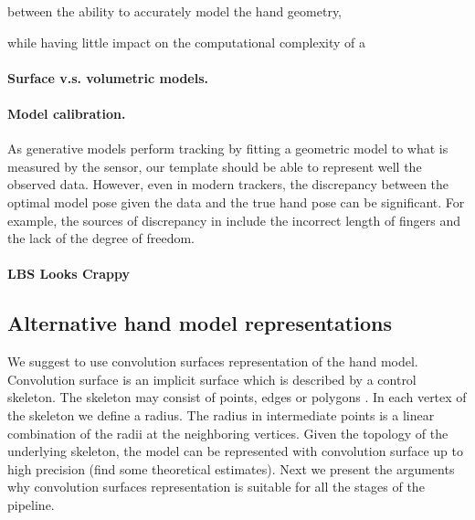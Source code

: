  

 between the ability to accurately model the hand geometry, 

while having little impact on the computational complexity of a   

\paragraph{Surface v.s. volumetric models.}


\paragraph{Model calibration.}

As generative models perform tracking by fitting a geometric model to what is measured by the sensor, our template should be able to represent well the observed data. However, even in modern trackers, the discrepancy between the optimal model pose given the data and the true hand pose can be significant. For example, the sources of discrepancy in  include the incorrect length of fingers and the lack of the  degree of freedom. 

\paragraph{LBS Looks Crappy}






\subsection{Alternative hand model representations}
We suggest to use convolution surfaces representation of the hand model. Convolution surface is an implicit surface which is described by a control skeleton. The skeleton may consist of points, edges or polygons \cite{bloomenthal1991convolution}. In each vertex of the skeleton we define a radius. The radius in intermediate points is a linear combination of the radii at the neighboring vertices. Given the topology of the underlying skeleton, the model can be represented with convolution surface up to high precision \textcolor{mygray}{(find some theoretical estimates).} Next we present the arguments why convolution surfaces representation is suitable for all the stages of the pipeline.

